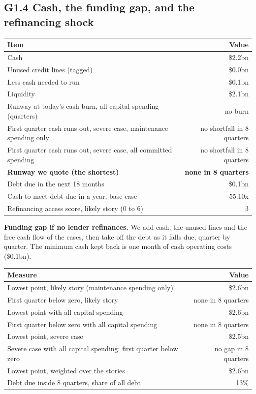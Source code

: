 \documentclass[11pt,a4paper]{article}
\begin{document}
\subsection*{G1.4 Cash, the funding gap, and the refinancing shock}
\begin{center}\footnotesize\setlength{\tabcolsep}{3.5pt}\begin{tabular}{@{}lr@{}}\toprule
Item & Value \\\midrule
Cash & \$2.2bn \\
Unused credit lines (tagged) & \$0.0bn \\
Less cash needed to run & \$0.1bn \\
Liquidity & \$2.1bn \\
Runway at today's cash burn, all capital spending (quarters) & no burn \\
First quarter cash runs out, severe case, maintenance spending only & no shortfall in 8 quarters \\
First quarter cash runs out, severe case, all committed spending & no shortfall in 8 quarters \\
\textbf{Runway we quote (the shortest)} & \textbf{none in 8 quarters} \\
Debt due in the next 18 months & \$0.1bn \\
Cash to meet debt due in a year, base case & 55.10x \\
Refinancing access score, likely story (0 to 6) & 3 \\
\bottomrule\end{tabular}\end{center}
\textbf{Funding gap if no lender refinances.} We add cash, the unused lines and the free cash flow of the cases, then take off the debt as it falls due, quarter by quarter. The minimum cash kept back is one month of cash operating costs (\$0.1bn).
\begin{center}\footnotesize\setlength{\tabcolsep}{3.5pt}\begin{tabular}{@{}lr@{}}\toprule
Measure & Value \\\midrule
Lowest point, likely story (maintenance spending only) & \$2.6bn \\
First quarter below zero, likely story & none in 8 quarters \\
Lowest point with all capital spending & \$2.6bn \\
First quarter below zero with all capital spending & none in 8 quarters \\
Lowest point, severe case & \$2.5bn \\
Severe case with all capital spending: first quarter below zero & no gap in 8 quarters \\
Lowest point, weighted over the stories & \$2.6bn \\
Debt due inside 8 quarters, share of all debt & 13\% \\
\bottomrule\end{tabular}\end{center}
\end{document}
